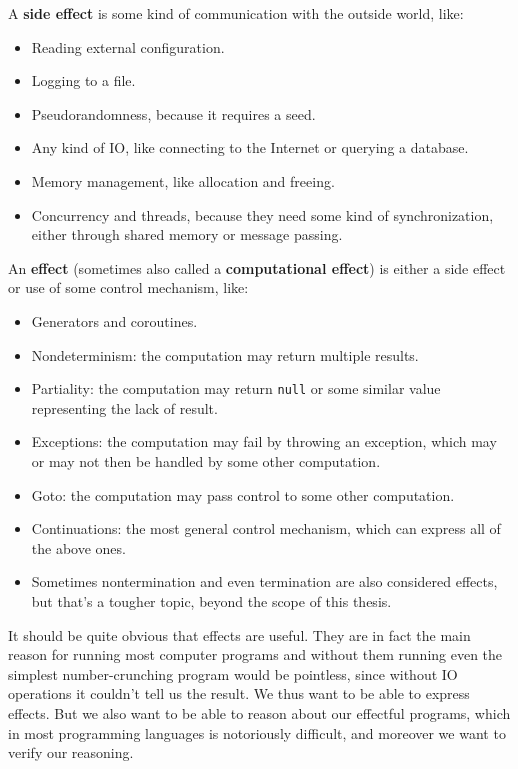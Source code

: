 \documentclass[declaration,inz,english,shortabstract]{iithesis}
\newcommand{\m}[1]{\texttt{#1}}
\begin{document}
A \textbf{side effect} is some kind of communication with the outside world, like:

\begin{itemize}
    \item Reading external configuration.
    \item Logging to a file.
    \item Pseudorandomness, because it requires a seed.
    \item Any kind of IO, like connecting to the Internet or querying a database.
    \item Memory management, like allocation and freeing.
    \item Concurrency and threads, because they need some kind of synchronization, either through shared memory or message passing.
\end{itemize}

An \textbf{effect} (sometimes also called a \textbf{computational effect}) is either a side effect or use of some control mechanism, like:

\begin{itemize}
    \item Generators and coroutines.
    \item Nondeterminism: the computation may return multiple results.
    \item Partiality: the computation may return \m{null} or some similar value representing the lack of result.
    \item Exceptions: the computation may fail by throwing an exception, which may or may not then be handled by some other computation.
    \item Goto: the computation may pass control to some other computation.
    \item Continuations: the most general control mechanism, which can express all of the above ones.
    \item Sometimes nontermination and even termination are also considered effects, but that's a tougher topic, beyond the scope of this thesis.
\end{itemize}

It should be quite obvious that effects are useful. They are in fact the main reason for running most computer programs and without them running even the simplest number-crunching program would be pointless, since without IO operations it couldn't tell us the result. We thus want to be able to express effects. But we also want to be able to reason about our effectful programs, which in most programming languages is notoriously difficult, and moreover we want to verify our reasoning.
\end{document}
